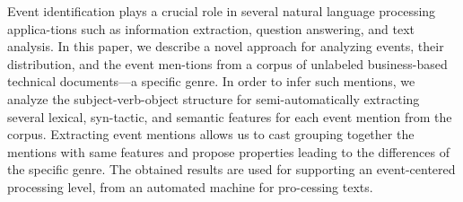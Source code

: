 Event identification plays a crucial role in several natural language processing applica-tions such as information extraction, question answering, and text analysis. In this paper, we describe a novel approach for analyzing events, their distribution, and the event men-tions from a corpus of unlabeled business-based technical documents—a specific genre. In order to infer such mentions, we analyze the subject-verb-object structure for semi-automatically extracting several lexical, syn-tactic, and semantic features for each event mention from the corpus. Extracting event mentions allows us to cast grouping together the mentions with same features and propose properties leading to the differences of the specific genre. The obtained results are used for supporting an event-centered processing level, from an automated machine for pro-cessing texts.

